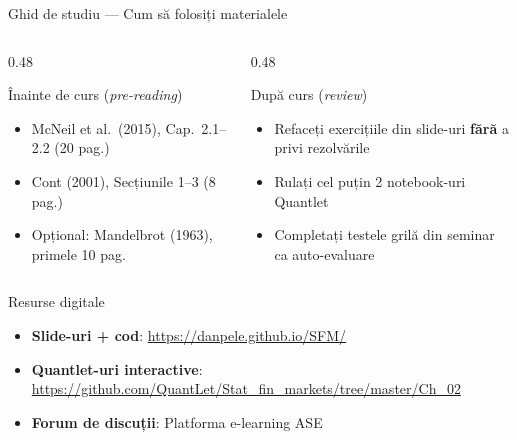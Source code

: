 \documentclass[9pt, aspectratio=169, t]{beamer}
\theoremstyle{definition}
\begin{document}
\begin{frame}{Ghid de studiu --- Cum să folosiți materialele}
\begin{columns}[T]
\begin{column}{0.48\textwidth}
\begin{block}{Înainte de curs (\textit{pre-reading})}
\begin{itemize}\setlength\itemsep{2pt}
\item McNeil et al.\ (2015), Cap.\ 2.1--2.2 (20 pag.)
\item Cont (2001), Secțiunile 1--3 (8 pag.)
\item Opțional: Mandelbrot (1963), primele 10 pag.
\end{itemize}
\end{block}
\end{column}
\begin{column}{0.48\textwidth}
\begin{block}{După curs (\textit{review})}
\begin{itemize}\setlength\itemsep{2pt}
\item Refaceți exercițiile din slide-uri \textbf{fără} a privi rezolvările
\item Rulați cel puțin 2 notebook-uri Quantlet
\item Completați testele grilă din seminar ca auto-evaluare
\end{itemize}
\end{block}
\end{column}
\end{columns}
\vspace{0.2cm}
\begin{alertblock}{Resurse digitale}
\begin{itemize}\setlength\itemsep{1pt}
\item \textbf{Slide-uri + cod}: \url{https://danpele.github.io/SFM/}
\item \textbf{Quantlet-uri interactive}: \url{https://github.com/QuantLet/Stat_fin_markets/tree/master/Ch_02}
\item \textbf{Forum de discuții}: Platforma e-learning ASE
\end{itemize}
\end{alertblock}
\end{frame}
\end{document}
